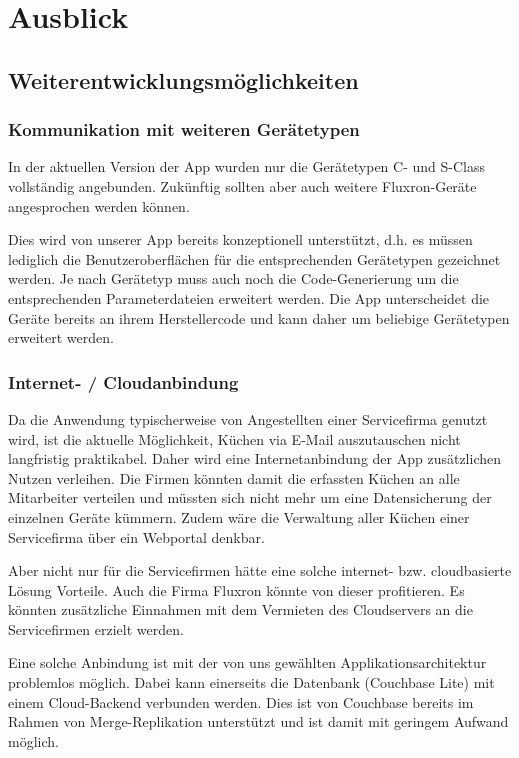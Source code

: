 \chapter{Ausblick}
\label{chap:Ausblick}

\section{Weiterentwicklungsmöglichkeiten}
\label{sec:Weiterentwicklungsmöglichkeiten}

\subsection{Kommunikation mit weiteren Gerätetypen}
\label{subsec:KommTypen}

In der aktuellen Version der App wurden nur die Gerätetypen C- und S-Class vollständig angebunden. Zukünftig sollten aber auch weitere Fluxron-Geräte angesprochen werden können.

Dies wird von unserer App bereits konzeptionell unterstützt, d.h. es müssen lediglich die Benutzeroberflächen für die entsprechenden Gerätetypen gezeichnet werden. Je nach Gerätetyp muss auch noch die Code-Generierung um die entsprechenden Parameterdateien erweitert werden. Die App unterscheidet die Geräte bereits an ihrem Herstellercode und kann daher um beliebige Gerätetypen erweitert werden.

\subsection{Internet- / Cloudanbindung}
\label{subsec:Internetanbindung}

Da die Anwendung typischerweise von Angestellten einer Servicefirma genutzt wird, ist die aktuelle Möglichkeit, Küchen via E-Mail auszutauschen nicht langfristig praktikabel. Daher wird eine Internetanbindung der App zusätzlichen Nutzen verleihen. Die Firmen könnten damit die erfassten Küchen an alle Mitarbeiter verteilen und müssten sich nicht mehr um eine Datensicherung der einzelnen Geräte kümmern. Zudem wäre die Verwaltung aller Küchen einer Servicefirma über ein Webportal denkbar.

Aber nicht nur für die Servicefirmen hätte eine solche internet- bzw. cloudbasierte Lösung Vorteile. Auch die Firma Fluxron könnte von dieser profitieren. Es könnten zusätzliche Einnahmen mit dem Vermieten des Cloudservers an die Servicefirmen erzielt werden.

Eine solche Anbindung ist mit der von uns gewählten Applikationsarchitektur problemlos möglich. Dabei kann einerseits die Datenbank (Couchbase Lite) mit einem Cloud-Backend verbunden werden. Dies ist von Couchbase bereits im Rahmen von Merge-Replikation unterstützt und ist damit mit geringem Aufwand möglich.

